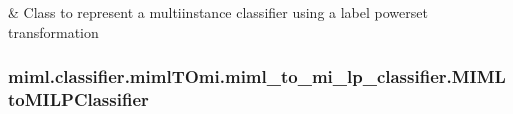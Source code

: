 \documentclass[letterpaper,10pt,english]{sphinxmanual}
\begin{document}
\begin{savenotes}\sphinxattablestart
\sphinxthistablewithglobalstyle
\sphinxthistablewithnovlinesstyle
\centering
\begin{tabulary}{\linewidth}[t]{}
\sphinxtoprule
\sphinxtableatstartofbodyhook
\sphinxAtStartPar
{\hyperref[\detokenize{classifier/mimlTOmi/_autosummary/miml.classifier.mimlTOmi.miml_to_mi_lp_classifier.MIMLtoMILPClassifier:miml.classifier.mimlTOmi.miml_to_mi_lp_classifier.MIMLtoMILPClassifier}]{}}
&
\sphinxAtStartPar
Class to represent a multi\sphinxhyphen{}instance classifier using a label powerset transformation
\\
\sphinxbottomrule
\end{tabulary}
\sphinxtableafterendhook\par
\sphinxattableend\end{savenotes}

\sphinxstepscope


\subsubsection{miml.classifier.mimlTOmi.miml\_to\_mi\_lp\_classifier.MIMLtoMILPClassifier}
\label{\detokenize{classifier/mimlTOmi/_autosummary/miml.classifier.mimlTOmi.miml_to_mi_lp_classifier.MIMLtoMILPClassifier:miml-classifier-mimltomi-miml-to-mi-lp-classifier-mimltomilpclassifier}}\label{\detokenize{classifier/mimlTOmi/_autosummary/miml.classifier.mimlTOmi.miml_to_mi_lp_classifier.MIMLtoMILPClassifier::doc}}
\end{document}
